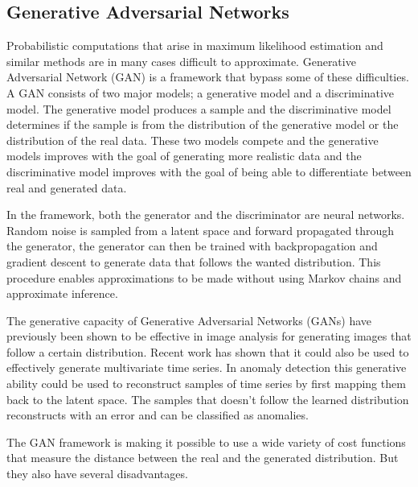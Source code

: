 

\subsection{Generative Adversarial Networks}

Probabilistic computations that arise in maximum likelihood estimation and similar methods are in many cases difficult to approximate. Generative Adversarial Network (GAN) is a framework that bypass some of these difficulties. A GAN consists of two major models; a generative model and a discriminative model. The generative model produces a sample and the discriminative model determines if the sample is from the distribution of the generative model or the distribution of the real data. These two models compete and the generative models improves with the goal of generating more realistic data and the discriminative model improves with the goal of being able to differentiate between real and generated data. 

In the framework, both the generator and the discriminator are neural networks. Random noise is sampled from a latent space and forward propagated through the generator, the generator can then be trained with backpropagation and gradient descent to generate data that follows the wanted distribution. This procedure enables approximations to be made without using Markov chains and approximate inference.  

The generative capacity of Generative Adversarial Networks (GANs) have previously been shown to be effective in image analysis for generating images that follow a certain distribution. Recent work has shown that it could also be used to effectively generate multivariate time series. In anomaly detection this generative ability could be used to reconstruct samples of time series by first mapping them back to the latent space. The samples that doesn't follow the learned distribution reconstructs with an error and can be classified as anomalies. 

The GAN framework is making it possible to use a wide variety of cost functions that measure the distance between the real and the generated distribution. But they also have several disadvantages. 



